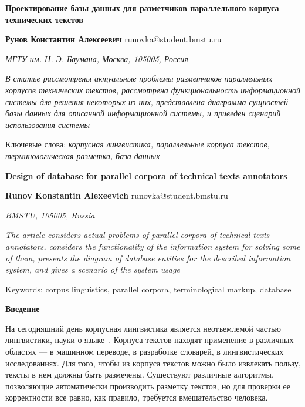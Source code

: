 \documentclass[a4paper,oneside,14pt]{article}
\begin{document}
\noindent
\textbf{Проектирование базы данных для разметчиков параллельного корпуса технических текстов}

\noindent
\textbf{Рунов Константин Алексеевич} \hfill runovka@student.bmstu.ru

\noindent
\textit{МГТУ им. Н. Э. Баумана, Москва, 105005, Россия}

\noindent
\textit{В статье рассмотрены актуальные проблемы разметчиков параллельных корпусов технических текстов, рассмотрена функциональность информационной системы для решения некоторых из них, представлена диаграмма сущностей базы данных для описанной информационной системы, и приведен сценарий использования системы}

\noindent
Ключевые слова:
\textit{
    корпусная лингвистика,
    параллельные корпуса текстов,
    терминологическая разметка,
    база данных
}


\noindent
\textbf{Design of database for parallel corpora of technical texts annotators}

\noindent
\textbf{Runov Konstantin Alexeevich} \hfill runovka@student.bmstu.ru

\noindent
\textit{BMSTU, 105005, Russia}

\noindent
\textit{The article considers actual problems of parallel corpora of technical texts annotators, considers the functionality of the information system for solving some of them, presents the diagram of database entities for the described information system, and gives a scenario of the system usage}

\noindent
Keywords:
corpus linguistics,
parallel corpora,
terminological markup,
database


\textbf{Введение}

На сегодняшний день корпусная лингвистика является неотъемлемой частью лингвистики, науки о языке~\cite{cl2020}.
Корпуса текстов находят применение в различных областях --- в машинном переводе, в разработке словарей, в лингвистических исследованиях.
Для того, чтобы из корпуса текстов можно было извлекать пользу, тексты в нем должны быть размечены.
Существуют различные алгоритмы, позволяющие автоматически производить разметку текстов, но для проверки ее корректности все равно, как правило, требуется вмешательство человека.
\end{document}
